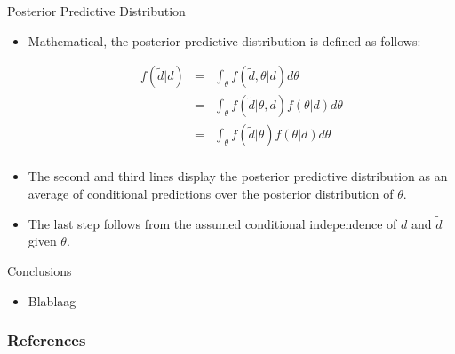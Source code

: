 \documentclass[handout]{beamer}
\begin{document}
\begin{frame}{Posterior Predictive Distribution}
\scriptsize{


\begin{itemize}
 
\item Mathematical, the posterior predictive distribution is defined as follows:

  \begin{eqnarray*}
 f(\tilde{d}|d) & = & \int_{\theta}f(\tilde{d},\theta|d)d\theta \\ 
                & = &  \int_{\theta}f(\tilde{d}|\theta,d)f(\theta|d)d\theta \\
                & = &  \int_{\theta}f(\tilde{d}|\theta)f(\theta|d)d\theta \\
 \end{eqnarray*}
 
 \item The second and third lines display the posterior predictive distribution as an average of conditional predictions over the posterior distribution of $\theta$.
 
 \item The last step follows from the assumed conditional independence of $d$ and $\tilde{d}$ given $\theta$.
 
 
 
\end{itemize}










} 
\end{frame}







\begin{frame}{Conclusions}
\scriptsize{

\begin{itemize}
\item Blablaag
\end{itemize}


} 
\end{frame}


\begin{frame}[allowframebreaks]\scriptsize
\frametitle{References}


%
\end{frame}  









\end{document}
